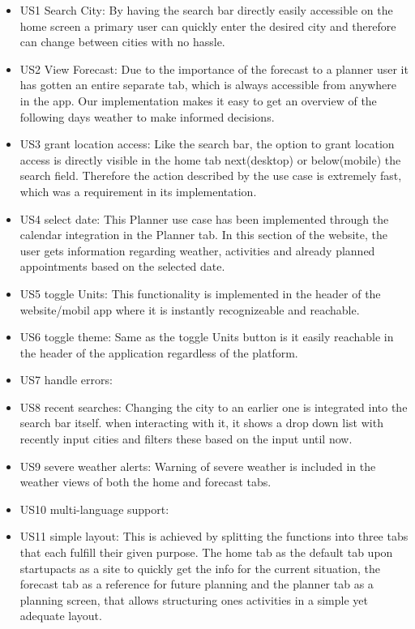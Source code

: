 \documentclass[11pt,a4paper]{article}
\begin{document}
\begin{itemize}
  \item US1 Search City: By having the search bar directly easily accessible on the home screen a primary user can quickly enter the desired city and therefore can change between cities with no hassle.
  \item US2 View Forecast: Due to the importance of the forecast to a planner user it has gotten an entire separate tab, which is always accessible from anywhere in the app. Our implementation makes it easy to get an overview of the following days weather to make informed decisions.
  \item US3 grant location access: Like the search bar, the option to grant location access is directly visible in the home tab next(desktop) or below(mobile) the search field. Therefore the action described by the use case is extremely fast, which was a requirement in its implementation.
  \item US4 select date: This Planner use case has been implemented through the calendar integration in the Planner tab. In this section of the website, the user gets information regarding weather, activities and already planned appointments based on the selected date.
  \item US5 toggle Units: This functionality is implemented in the header of the website/mobil app where it is instantly recognizeable and reachable.
  \item US6 toggle theme: Same as the toggle Units button is it easily reachable in the header of the application regardless of the platform.
  \item US7 handle errors:
  \item US8 recent searches: Changing the city to an earlier one is integrated into the search bar itself. when interacting with it, it shows a drop down list with recently input cities and filters these based on the input until now.
  \item US9 severe weather alerts: Warning of severe weather is included in the weather views of both the home and forecast tabs.
  \item US10 multi-language support:
  \item US11 simple layout: This is achieved by splitting the functions into three tabs that each fulfill their given purpose. The home tab as the default tab upon startupacts as a site to quickly get the info for the current situation, the forecast tab as a reference for future planning and the planner tab as a planning screen, that allows structuring ones activities in a simple yet adequate layout.
\end{itemize}
\end{document}

